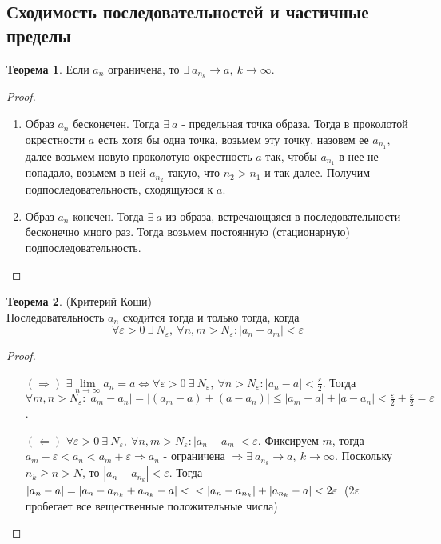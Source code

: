 \documentclass[a4paper, 12pt]{article}
\renewcommand{\epsilon}{\varepsilon}
\newcommand\tab[1][.5cm]{\hspace*{#1}}
\newcommand{\lims}{\lim\limits_{n\to \infty}}
\theoremstyle{definition}
\newtheorem*{theorem}{Теорема}
\begin{document}
    \subsection{Сходимость последовательностей и частичные пределы}
        \begin{theorem}
            Если $a_n$ ограничена, то $\exists\ a_{n_k}\to a,\ k\to \infty$. 
        \end{theorem}
        \begin{proof}\tab
            \begin{enumerate}
                \item Образ $a_n$ бесконечен. Тогда $\exists\ a$ - предельная точка образа. Тогда в проколотой окрестности $a$ есть хотя бы одна точка, возьмем эту точку, назовем ее $a_{n_1}$, далее возьмем новую проколотую окрестность $a$ так, чтобы $a_{n_1}$ в нее не попадало, возьмем в ней $a_{n_2}$ такую, что $n_2>n_1$ и так далее. Получим подпоследовательность, сходящуюся к $a$. 
                \item Образ $a_n$ конечен. Тогда $\exists\ a$ из образа, встречающаяся в последовательности бесконечно много раз. Тогда возьмем постоянную (стационарную) подпоследовательность.
            \end{enumerate}
        \end{proof} 
        \begin{theorem} (Критерий Коши)\\
            Последовательность $a_n$ сходится тогда и только тогда, когда
            \[\forall \epsilon>0\ \exists\ N_{\epsilon},\ \forall n,m>N_{\epsilon}: |a_n-a_m|<\epsilon\]
        \end{theorem} 
        \begin{proof}\tab
            \begin{itemize}
                \item[$(\Rightarrow)$] $\exists \lims a_n =a \Leftrightarrow \forall \epsilon>0\ \exists\ N_{\epsilon},\ \forall n>N_{\epsilon}: |a_n-a|<\frac{\epsilon}{2}$. Тогда $\forall m,n>N_{\epsilon}: |a_m-a_n|=|(a_m-a)+(a-a_n)|\leq |a_m-a|+|a-a_n|<\frac{\epsilon}{2}+\frac{\epsilon}{2}=\epsilon$. 
                \item[$(\Leftarrow)$] $\forall \epsilon>0\ \exists\ N_{\epsilon},\ \forall n,m>N_{\epsilon}: |a_n-a_m|<\epsilon$. Фиксируем $m$, тогда\\ $a_m-\epsilon<a_n<a_m+\epsilon \Rightarrow a_n$ - ограничена $\Rightarrow \exists\ a_{n_k}\to a,\ k\to \infty$. Поскольку $n_k\geq n > N$, то $|a_n-a_{n_k}|<\epsilon$. Тогда $|a_n-a|=|a_n-a_{n_k}+a_{n_k}-a|<\\<|a_n-a_{n_k}|+|a_{n_k}-a|<2\epsilon$\ ($2\epsilon$ пробегает все вещественные положительные числа) 
            \end{itemize}
        \end{proof} 
\end{document}
